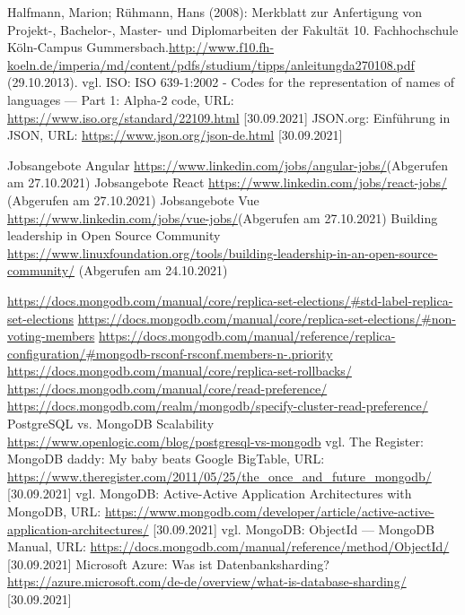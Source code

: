 \begin{thebibliography}{HR08}
   Halfmann, Marion; Rühmann, Hans (2008): Merkblatt zur Anfertigung von Projekt-, Bachelor-, Master- und Diplomarbeiten der Fakultät 10. Fachhochschule Köln-Campus Gummersbach.\url{http://www.f10.fh-koeln.de/imperia/md/content/pdfs/studium/tipps/anleitungda270108.pdf} (29.10.2013).
   vgl. ISO: ISO 639-1:2002 - Codes for the representation of names of languages — Part 1: Alpha-2 code, URL: \url{https://www.iso.org/standard/22109.html} [30.09.2021]
   JSON.org: Einführung in JSON, URL: \url{https://www.json.org/json-de.html} [30.09.2021]

   Jobsangebote Angular \url{https://www.linkedin.com/jobs/angular-jobs/}(Abgerufen am 27.10.2021)
   Jobsangebote React \url{https://www.linkedin.com/jobs/react-jobs/}  (Abgerufen am 27.10.2021)
   Jobsangebote Vue \url{https://www.linkedin.com/jobs/vue-jobs/}(Abgerufen am 27.10.2021)
  Building leadership in Open Source Community \url{https://www.linuxfoundation.org/tools/building-leadership-in-an-open-source-community/} (Abgerufen am 24.10.2021)

   \url{https://docs.mongodb.com/manual/core/replica-set-elections/#std-label-replica-set-elections}
   \url{https://docs.mongodb.com/manual/core/replica-set-elections/#non-voting-members}
   \url{https://docs.mongodb.com/manual/reference/replica-configuration/#mongodb-rsconf-rsconf.members-n-.priority}
   \url{https://docs.mongodb.com/manual/core/replica-set-rollbacks/}
   \url{https://docs.mongodb.com/manual/core/read-preference/}
   \url{https://docs.mongodb.com/realm/mongodb/specify-cluster-read-preference/}
   PostgreSQL vs. MongoDB Scalability \url{https://www.openlogic.com/blog/postgresql-vs-mongodb}
   vgl. The Register: MongoDB daddy: My baby beats Google BigTable, URL: \url{https://www.theregister.com/2011/05/25/the_once_and_future_mongodb/} [30.09.2021]
   vgl. MongoDB: Active-Active Application Architectures with MongoDB, URL: \url{https://www.mongodb.com/developer/article/active-active-application-architectures/} [30.09.2021]
   vgl. MongoDB: ObjectId — MongoDB Manual, URL: \url{https://docs.mongodb.com/manual/reference/method/ObjectId/} [30.09.2021]
   Microsoft Azure: Was ist Datenbanksharding? \url{https://azure.microsoft.com/de-de/overview/what-is-database-sharding/} [30.09.2021]


\end{thebibliography}
